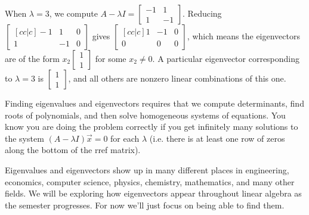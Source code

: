 {\begin{example}
When {$\lambda=3$}, we compute {$A-\lambda I =\begin{bmatrix} -1&1\\1&-1\end{bmatrix} $}. Reducing  
$\begin{bmatrix}[cc|c] -1&1&0\\1&-1&0\end{bmatrix}$ gives
$\begin{bmatrix}[cc|c] 1&-1&0\\0&0&0\end{bmatrix}$, which means the eigenvectors are of the form $x_2\begin{bmatrix} 1\\1\end{bmatrix} $ for some {$x_2\neq 0$}. A particular eigenvector corresponding to $\lambda=3$ is $\begin{bmatrix} 1\\1\end{bmatrix} $, and all others are nonzero linear combinations of this one.
\end{example}

Finding eigenvalues and eigenvectors requires that we compute determinants, find roots of polynomials, and then solve homogeneous systems of equations. You know you are doing the problem correctly if you get infinitely many solutions to the system $(A-\lambda I)\vec x=0$ for each $\lambda$ (i.e. there is at least one row of zeros along the bottom of the rref matrix).

Eigenvalues and eigenvectors show up in many different places in engineering, economics, computer science, physics, chemistry, mathematics, and many other fields. We will be exploring how eigenvectors appear throughout linear algebra 
as the semester progresses.  For now we'll just focus on being able to find them.

}
